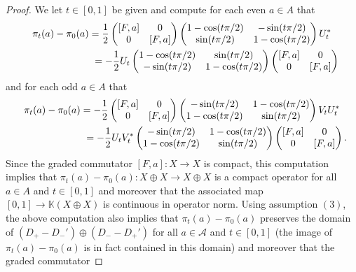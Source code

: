 \documentclass[11pt]{article}
\numberwithin{equation}{section}
\newcommand{\op}{\oplus}
\newcommand{\s}[1]{\mathscr{#1}}
\newcommand{\B}[1]{\mathbb{#1}}
\begin{document}
\begin{proof}
We let $t \in [0,1]$ be given and compute for each even $a \in A$ that
\begin{gather*}
\pi_t(a) - \pi_0(a)
 = \frac{1}{2} \left(\begin{matrix} [F,a] & 0 \\ 0 & [F,a]\end{matrix}\right) \left(\begin{matrix} 1 - \cos(t \pi/2) & - \sin(t \pi /2) \\ \sin(t \pi/2) & 1 - \cos( t \pi/2)\end{matrix}\right) U_t^* \nonumber\\
\hphantom{\pi_t(a) - \pi_0(a)=}{} = -\frac{1}{2} U_t \left(\begin{matrix} 1 - \cos(t \pi/2) & \sin(t \pi /2) \\ -\sin(t \pi/2) & 1 - \cos( t \pi/2)\end{matrix}\right) \left(\begin{matrix} [F,a] & 0 \\ 0 & [F,a]\end{matrix}\right)%
\end{gather*}
and for each odd $a \in A$ that
\begin{gather*}
\pi_t(a) - \pi_0(a)
 = - \frac{1}{2} \left(\begin{matrix} [F,a] & 0 \\ 0 & [F,a]\end{matrix}\right)
\left(\begin{matrix} -\sin(t \pi / 2) & 1 - \cos(t \pi/2) \\ 1 - \cos( t \pi/2) & \sin(t \pi/2) \end{matrix}\right) V_t U_t^* \\
\hphantom{\pi_t(a) - \pi_0(a)=}{} = -\frac{1}{2} U_t V_t^* \left(\begin{matrix} -\sin(t \pi / 2) & 1 - \cos(t \pi/2) \\ 1 - \cos( t \pi/2) & \sin(t \pi/2) \end{matrix}\right) \left(\begin{matrix} [F,a] & 0 \\ 0 & [F,a]\end{matrix}\right) .%
\end{gather*}
Since the graded commutator $[F,a]\colon X \to X$ is compact, this computation implies that $\pi_t(a) - \pi_0(a)\colon X \op X \to X \op X$ is a compact operator for all $a \in A$ and $t \in [0,1]$ and moreover that the associated map $[0,1] \to \B K(X \op X)$ is continuous in operator norm. Using assumption $(3)$, the above computation also implies that $\pi_t(a) - \pi_0(a)$ preserves the domain of $(D_+ - D_-') \op (D_- - D_+')$ for all $a \in \s A$ and $t \in [0,1]$ (the image of $\pi_t(a) - \pi_0(a)$ is in fact contained in this domain) and moreover that the graded commutator

\end{proof}
\end{document}
